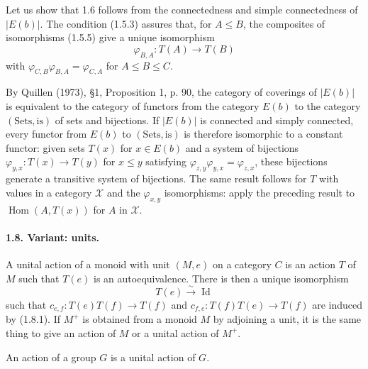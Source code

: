 \documentclass[11pt]{article}
\newcommand{\Id}{\operatorname{Id}}
\newcommand{\Hom}{\operatorname{Hom}}
\newcommand{\calX}{\mathcal X}
\begin{document}
Let us show that 1.6 follows from the connectedness and simple connectedness of $|E(b)|$. The condition (1.5.3) assures that, for $A\leq B$, the composites of isomorphisms (1.5.5) give a unique isomorphism
\[
 \varphi_{B,A}:T(A)\longrightarrow T(B)
\]
with $\varphi_{C,B}\varphi_{B,A}=\varphi_{C,A}$ for $A\leq B\leq C$.

By Quillen (1973), \S1, Proposition 1, p. 90, the category of coverings of $|E(b)|$ is equivalent to the category of functors from the category $E(b)$ to the category $(\mathrm{Sets},\mathrm{is})$ of sets and bijections. If $|E(b)|$ is connected and simply connected, every functor from $E(b)$ to $(\mathrm{Sets},\mathrm{is})$ is therefore isomorphic to a constant functor: given sets $T(x)$ for $x\in E(b)$ and a system of bijections $\varphi_{y,x}:T(x)\to T(y)$ for $x\leq y$ satisfying $\varphi_{z,y}\varphi_{y,x}=\varphi_{z,x}$, these bijections generate a transitive system of bijections. The same result follows for $T$ with values in a category $\calX$ and the $\varphi_{x,y}$ isomorphisms: apply the preceding result to $\Hom(A,T(x))$ for $A$ in $\calX$.

\paragraph{1.8. Variant: units.} A unital action of a monoid with unit $(M,e)$ on a category $C$ is an action $T$ of $M$ such that $T(e)$ is an autoequivalence. There is then a unique isomorphism
\begin{equation}
 T(e)\xrightarrow{\sim}\Id
\tag{1.8.1}
\end{equation}
such that $c_{e,f}:T(e)T(f)\to T(f)$ and $c_{f,e}:T(f)T(e)\to T(f)$ are induced by (1.8.1). If $M^+$ is obtained from a monoid $M$ by adjoining a unit, it is the same thing to give an action of $M$ or a unital action of $M^+$.

An action of a group $G$ is a unital action of $G$.
\end{document}
